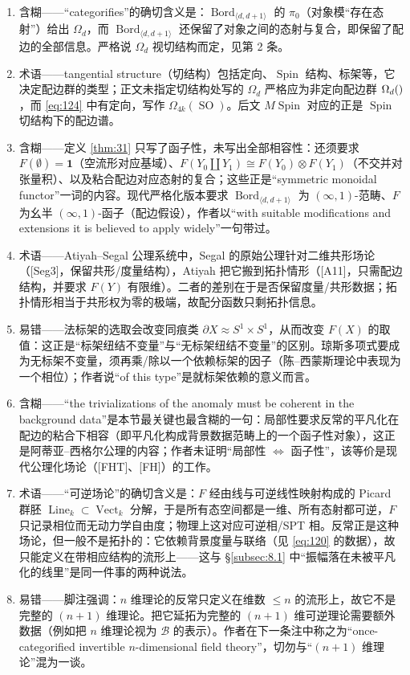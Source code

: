 \documentclass[11pt]{amsart}
\theoremstyle{definition}
\theoremstyle{remark}
\theoremstyle{plain}
\numberwithin{equation}{section}
\renewcommand{\:}{\colon}
\DeclareMathOperator{\Spin}{Spin}
\newcommand{\cir}{S^1}
\DeclareMathOperator{\SO}{SO}
\let\O\relax
\DeclareMathOperator{\O}{O}
\let\O\relax\DeclareMathOperator{\O}{O}
\DeclareMathOperator{\Bord}{Bord}
\DeclareMathOperator{\Line}{Line}
\DeclareMathOperator{\Vect}{Vect}
\newcommand{\Bd}{\Bord_{\langle d,d+1  \rangle}}
\newcommand{\Vk}{\Vect_k}
\newcommand{\sB}{\mathscr{B}}
\begin{document}
\begin{enumerate}[leftmargin=2.2em,itemsep=2pt,topsep=2pt]
  \item 含糊——“categorifies”的确切含义是：$\Bd$ 的 $\pi_0$（对象模“存在态射”）给出 $\Omega _d$，而 $\Bd$ 还保留了对象之间的态射与复合，即保留了配边的全部信息。严格说 $\Omega _d$ 视切结构而定，见第 2 条。
  \item 术语——tangential structure（切结构）包括定向、$\Spin$ 结构、标架等，它决定配边群的类型；正文未指定切结构处写的 $\Omega _d$ 严格应为非定向配边群 $\Omega _d(\O)$，而 \eqref{eq:124} 中有定向，写作 $\Omega _{4k}(\SO)$。后文 $M\!\Spin$ 对应的正是 $\Spin$ 切结构下的配边谱。
  \item 含糊——定义 \ref{thm:31} 只写了函子性，未写出全部相容性：还须要求 $F(\emptyset)=\mathbf{1}$（空流形对应基域）、$F(Y_0\amalg Y_1)\cong F(Y_0)\otimes F(Y_1)$（不交并对张量积）、以及粘合配边对应态射的复合；这些正是“symmetric monoidal functor”一词的内容。现代严格化版本要求 $\Bd$ 为 $(\infty,1)$-范畴、$F$ 为幺半 $(\infty,1)$-函子（配边假设），作者以“with suitable modifications and extensions it is believed to apply widely”一句带过。
  \item 术语——Atiyah–Segal 公理系统中，Segal 的原始公理针对二维共形场论（[Seg3]，保留共形/度量结构），Atiyah 把它搬到拓扑情形（[A11]，只需配边结构，并要求 $F(Y)$ 有限维）。二者的差别在于是否保留度量/共形数据；拓扑情形相当于共形权为零的极端，故配分函数只剩拓扑信息。
  \item 易错——法标架的选取会改变同痕类 $\partial X\approx\cir\times \cir$，从而改变 $F(X)$ 的取值：这正是“标架纽结不变量”与“无标架纽结不变量”的区别。琼斯多项式要成为无标架不变量，须再乘/除以一个依赖标架的因子（陈–西蒙斯理论中表现为一个相位）；作者说“of this type”是就标架依赖的意义而言。
  \item 含糊——“the trivializations of the anomaly must be coherent in the background data”是本节最关键也最含糊的一句：局部性要求反常的平凡化在配边的粘合下相容（即平凡化构成背景数据范畴上的一个函子性对象），这正是阿蒂亚–西格尔公理的内容；作者未证明“局部性 $\Leftrightarrow$ 函子性”，该等价是现代公理化场论（[FHT]、[FH]）的工作。
  \item 术语——“可逆场论”的确切含义是：$F$ 经由线与可逆线性映射构成的 Picard 群胚 $\Line_k\subset \Vk$ 分解，于是所有态空间都是一维、所有态射都可逆，$F$ 只记录相位而无动力学自由度；物理上这对应可逆相/SPT 相。反常正是这种场论，但一般不是拓扑的：它依赖背景度量与联络（见 \eqref{eq:120} 的数据），故只能定义在带相应结构的流形上——这与 §\ref{subsec:8.1} 中“振幅落在未被平凡化的线里”是同一件事的两种说法。
  \item 易错——脚注强调：$n$ 维理论的反常只定义在维数 $\le n$ 的流形上，故它不是完整的 $(n+1)$ 维理论。把它延拓为完整的 $(n+1)$ 维可逆理论需要额外数据（例如把 $n$ 维理论视为 $\sB$ 的表示）。作者在下一条注中称之为“once-categorified invertible $n$-dimensional field theory”，切勿与“$(n+1)$ 维理论”混为一谈。

\end{enumerate}
\end{document}
